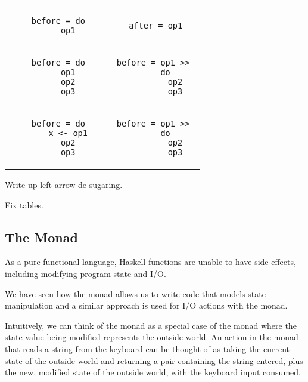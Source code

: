 \begin{table}[h]
\begin{tabular}{c c}
    \begin{lstlisting}
    before = do
        op1
    \end{lstlisting}
    &
    \begin{lstlisting}
    after = op1
    \end{lstlisting} \\

    \begin{lstlisting}
    before = do
        op1
        op2
        op3
    \end{lstlisting}
    &
    \begin{lstlisting}
    before = op1 >> 
        do
            op2
            op3

    \end{lstlisting} \\

    \begin{lstlisting}
    before = do
        x <- op1
        op2
        op3
    \end{lstlisting}
    &
    \begin{lstlisting}
    before = op1 >> 
        do
            op2
            op3

    \end{lstlisting} \\
\end{tabular}
\end{table}

\begin{notelist}
    \item Write up left-arrow de-sugaring.
    \item Fix tables.
\end{notelist}

\subsection{The  Monad}

As a pure functional language, Haskell functions are unable to have side effects, including modifying program state and I/O.

We have seen how the  monad allows us to write code that models state manipulation and a similar approach is used
for I/O actions with the  monad.

Intuitively, we can think of the  monad as a special case of the  monad where the state value being modified
represents the outside world. An action in the  monad that reads a string from the keyboard can be thought of as taking
the current state of the outside world and returning a pair containing the string entered, plus the new, modified state of the
outside world, with the keyboard input consumed.

